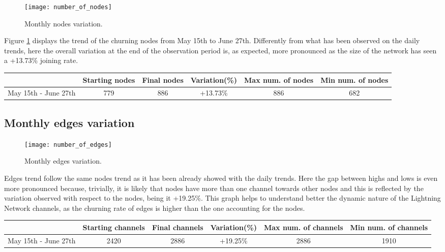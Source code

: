 	\begin{figure}
		\centering
		\texttt{[image: number\_of\_nodes]}
		\caption{Monthly nodes variation.}
		\label{monthly_nodes}
	\end{figure}
	
	Figure \ref{monthly_nodes} displays the trend of the churning nodes from May 15th to June 27th. Differently from what has been observed on the daily trends, here the overall variation at the end of the observation period is, as expected, more pronounced as the size of the network has seen a +13.73\% joining rate.
	
	\begin{center}
		\begin{tabulary}{\linewidth}{| L | C | C | C | C | C |}
			\hline	
			& Starting nodes & Final nodes  & Variation(\%) & Max num. of nodes & Min num. of nodes \\ \hline
			May 15th - June 27th & 779 & 886 & +13.73\% & 886 & 682 \\ \hline
		\end{tabulary}
	\end{center}
	
	\subsection{Monthly edges variation}
	\begin{figure}
		\centering
		\texttt{[image: number\_of\_edges]}
		\caption{Monthly edges variation.}
		\label{monthly_edges}
	\end{figure}

	Edges trend follow the same nodes trend as it has been already showed with the daily trends. Here the gap between highs and lows is even more pronounced because, trivially, it is likely that nodes have more than one channel towards other nodes and this is reflected by the variation observed with respect to the nodes, being it +19.25\%. This graph helps to understand better the dynamic nature of the Lightning Network channels, as the churning rate of edges is higher than the one accounting for the nodes. 
	
	\begin{center}
		\begin{tabulary}{\linewidth}{| L | C | C | C | C | C |}
			\hline	
			& Starting channels & Final channels  & Variation(\%) & Max num. of channels & Min num. of channels \\ \hline
			May 15th - June 27th & 2420 & 2886 & +19.25\% & 2886 & 1910 \\ \hline
		\end{tabulary}
	\end{center}
	
